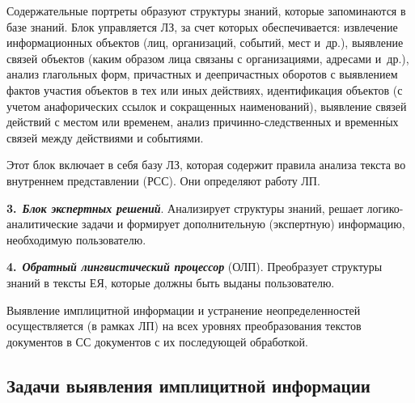 \begin{multicols}{2}
     Содержательные портреты образуют структуры знаний, которые 
запоминаются в базе знаний. Блок управляется ЛЗ, за счет которых 
обеспечивается: извлечение информационных объектов (лиц, организаций, 
событий, мест и~др.), выявление связей объектов (каким образом лица связаны 
с организациями, адресами и~др.), анализ глагольных форм, причастных и 
деепричастных оборотов с выявлением фактов участия объектов в тех или иных 
действиях, идентификация объектов (с учетом анафорических ссылок и 
сокращенных наименований), выявление связей действий с местом или 
временем, анализ при\-чин\-но-след\-ст\-вен\-ных и временн$\acute{\mbox{ы}}$х связей между 
действиями и событиями.

\pagebreak
     
     Этот блок включает в себя базу ЛЗ, которая 
содержит правила анализа текста во внутреннем представлении (РСС). Они 
определяют работу ЛП.

\smallskip
     
\textbf{3.}\      {\bfseries\textit{Блок экспертных решений}}. Анализирует 
структуры знаний, решает ло\-ги\-ко-ана\-ли\-ти\-че\-ские задачи и формирует 
дополнительную (экспертную) информацию, необходимую пользователю. 

\smallskip
     
\textbf{4.}\      {\bfseries\textit{Обратный лингвистический процессор}} (ОЛП). 
Преобразует структуры знаний в тексты ЕЯ, которые должны быть выданы 
пользователю.
     
     Выявление имплицитной информации и устранение неопределенностей 
осуществляется (в рамках ЛП) на всех уровнях преобразования текстов 
документов в СС документов с их последующей обработкой.

\subsection{Задачи выявления имплицитной информации}
     

\end{multicols}
